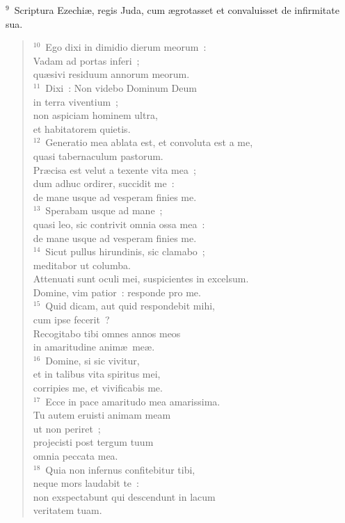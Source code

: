 ${}^{9}$~Scriptura Ezechi\ae , regis Juda, cum \ae grotasset et convaluisset de infirmitate sua.
\begin{flushleft}\begin{verse}${}^{10}$~Ego dixi in dimidio dierum meorum~:\\ Vadam ad portas inferi~;\\ qu\ae sivi residuum annorum meorum.\\
${}^{11}$~Dixi~: Non videbo Dominum Deum\\ in terra viventium~;\\ non aspiciam hominem ultra,\\ et habitatorem quietis.\\
${}^{12}$~Generatio mea ablata est, et convoluta est a me,\\ quasi tabernaculum pastorum.\\ Pr\ae cisa est velut a texente vita mea~;\\ dum adhuc ordirer, succidit me~:\\ de mane usque ad vesperam finies me.\\
${}^{13}$~Sperabam usque ad mane~;\\ quasi leo, sic contrivit omnia ossa mea~:\\ de mane usque ad vesperam finies me.\\
${}^{14}$~Sicut pullus hirundinis, sic clamabo~;\\ meditabor ut columba.\\ Attenuati sunt oculi mei, suspicientes in excelsum.\\ Domine, vim patior~: responde pro me.\\
${}^{15}$~Quid dicam, aut quid respondebit mihi,\\ cum ipse fecerit~?\\ Recogitabo tibi omnes annos meos\\ in amaritudine anim\ae\ me\ae .\\
${}^{16}$~Domine, si sic vivitur,\\ et in talibus vita spiritus mei,\\ corripies me, et vivificabis me.\\
${}^{17}$~Ecce in pace amaritudo mea amarissima.\\ Tu autem eruisti animam meam\\ ut non periret~;\\ projecisti post tergum tuum\\ omnia peccata mea.\\
${}^{18}$~Quia non infernus confitebitur tibi,\\ neque mors laudabit te~:\\ non exspectabunt qui descendunt in lacum\\ veritatem tuam.\\

\end{verse}
\end{flushleft}
